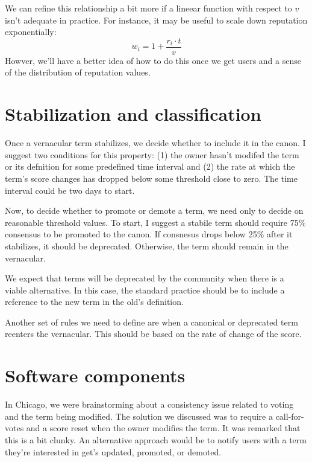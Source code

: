\documentclass[letter]{article}
\begin{document}
We can refine this relationship a bit more if a lineear function with respect to $v$ isn't adequate
in practice. For instance, it may be useful to scale down reputation exponentially: 
$$ w_i = 1 + \frac{r_i \cdot t}{v} $$
Howver, we'll have a better idea of how to do this once we get users and a sense of the distribution 
of reputation values. 

\section{Stabilization and classification}
Once a vernacular term stabilizes, we decide whether to include it in the canon. I suggest two 
conditions for this property: (1) the owner hasn't modifed the term or its defnition for some 
predefined time interval and (2) the rate at which the term's score changes has dropped below some
threshold close to zero. The time interval could be two days to start. 

Now, to decide whether to promote or demote a term, we need only to decide on reasonable threshold
values. To start, I suggest a stabile term should require 75\% consensus to be promoted to the canon. If 
consnesus drops below 25\% after it stabilizes, it should be deprecated. Otherwise, the term should 
remain in the vernacular. 

We expect that terms will be
deprecated by the community when there is a viable alternative. In this case, the standard practice should 
be to include a reference to the new term in the old's definition. 

Another set of rules we need to define are when a canonical or deprecated term reenters the vernacular. 
This should be based on the rate of change of the score. 

\section{Software components}
In Chicago, we were brainstorming about a consistency issue related to voting and the term being 
modified. The solution we discussed was to require a call-for-votes and a score reset when the 
owner modifies the term. It was remarked that this is a bit clunky. An alternative approach would be
to notify users with a term they're interested in get's updated, promoted, or demoted. 
\end{document}
